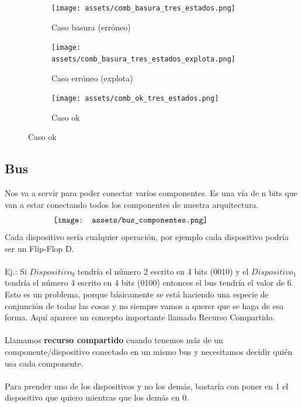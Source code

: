 \documentclass[10pt,a4paper]{article}
\begin{document}
\begin{figure}[h]
    \begin{subfigure}{0.6\textwidth}
        \centering
        \texttt{[image: assets/comb\_basura\_tres\_estados.png]}
        \caption{Caso basura (erróneo)}
        \label{fig:comb_basura_tres_estados}
        \end{subfigure}
    \begin{subfigure}{0.6\textwidth}
        \centering
    \texttt{[image: assets/comb\_basura\_tres\_estados\_explota.png]}
    \caption{Caso erróneo (explota)}
    \label{fig:comb_basura_tres_estados_explota}
    \end{subfigure}
    \begin{subfigure}{0.6\textwidth}
        \centering
    \texttt{[image: assets/comb\_ok\_tres\_estados.png]}
    \caption{Caso ok}
    \label{fig:comb_ok_tres_estados}
    \end{subfigure}

    \end{figure}


\subsection*{Bus}
Nos va a servir para poder conectar varios componentes. Es una vía de n bits que van a estar conectando todos los componentes de nuestra arquitectura.
\[\begin{minipage}[b]{0.7\textwidth}
    \texttt{[image: assets/bus\_componentes.png]}
    \label{fig:bus_componentes}
\end{minipage}\]
Cada dispositivo sería cualquier operación, por ejemplo cada dispositivo podría ser un Flip-Flop D. \\ \\
Ej.: Si \(Dispositivo_{0}\) tendría el número 2 escrito en 4 bits (0010) y el \(Dispositivo_{1}\) tendría el número 4 escrito en 4 bits (0100) entonces el bus tendría el valor de 6. Esto es un problema, porque básicamente se está haciendo una especie de conjunción de todas las cosas y no siempre vamos a querer que se haga de esa forma. Aquí aparece un concepto importante llamado Recurso Compartido. \\ \\
Llamamos \textbf{recurso compartido} cuando tenemos más de un componente/dispositivo conectado en un mismo bus y necesitamos decidir quién usa cada componente. \\ \\
Para prender uno de los dispositivos y no los demás, bastaría con poner en 1 el dispositivo que quiero mientras que los demás en 0.
\end{document}
